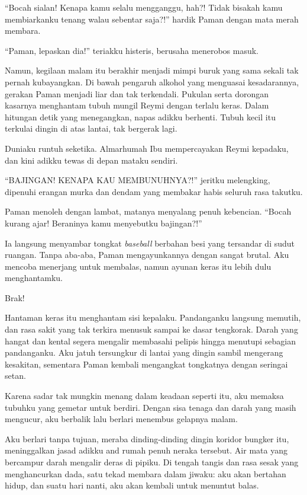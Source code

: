 ``Bocah sialan! Kenapa kamu selalu mengganggu, hah?! Tidak bisakah kamu membiarkanku tenang walau sebentar saja?!'' hardik Paman dengan mata merah membara.

``Paman, lepaskan dia!'' teriakku histeris, berusaha menerobos masuk.

Namun, kegilaan malam itu berakhir menjadi mimpi buruk yang sama sekali tak pernah kubayangkan. Di bawah pengaruh alkohol yang menguasai kesadarannya, gerakan Paman menjadi liar dan tak terkendali. Pukulan serta dorongan kasarnya menghantam tubuh mungil Reymi dengan terlalu keras. Dalam hitungan detik yang menegangkan, napas adikku berhenti. Tubuh kecil itu terkulai dingin di atas lantai, tak bergerak lagi.

Duniaku runtuh seketika. Almarhumah Ibu mempercayakan Reymi kepadaku, dan kini adikku tewas di depan mataku sendiri.

``BAJINGAN! KENAPA KAU MEMBUNUHNYA?!'' jeritku melengking, dipenuhi erangan murka dan dendam yang membakar habis seluruh rasa takutku.

Paman menoleh dengan lambat, matanya menyalang penuh kebencian. ``Bocah kurang ajar! Beraninya kamu menyebutku bajingan?!''

Ia langsung menyambar tongkat \textit{baseball} berbahan besi yang tersandar di sudut ruangan. Tanpa aba-aba, Paman mengayunkannya dengan sangat brutal. Aku mencoba menerjang untuk membalas, namun ayunan keras itu lebih dulu menghantamku.

Brak!

Hantaman keras itu menghantam sisi kepalaku. Pandanganku langsung memutih, dan rasa sakit yang tak terkira menusuk sampai ke dasar tengkorak. Darah yang hangat dan kental segera mengalir membasahi pelipis hingga menutupi sebagian pandanganku. Aku jatuh tersungkur di lantai yang dingin sambil mengerang kesakitan, sementara Paman kembali mengangkat tongkatnya dengan seringai setan.

Karena sadar tak mungkin menang dalam keadaan seperti itu, aku memaksa tubuhku yang gemetar untuk berdiri. Dengan sisa tenaga dan darah yang masih mengucur, aku berbalik lalu berlari menembus gelapnya malam.

Aku berlari tanpa tujuan, meraba dinding-dinding dingin koridor bungker itu, meninggalkan jasad adikku and rumah penuh neraka tersebut. Air mata yang bercampur darah mengalir deras di pipiku. Di tengah tangis dan rasa sesak yang menghancurkan dada, satu tekad membara dalam jiwaku: aku akan bertahan hidup, dan suatu hari nanti, aku akan kembali untuk menuntut balas.

